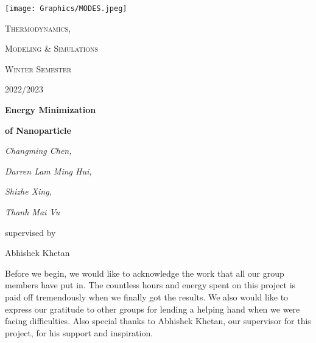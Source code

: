\documentclass{scrartcl}
\begin{document}
\begin{titlepage}
	\centering
	\texttt{[image: Graphics/MODES.jpeg]}\par
	\vspace{2cm}
	{\scshape\LARGE Thermodynamics, \par}  %
	{\scshape\LARGE Modeling \& Simulations \par}                
	\vspace{1cm}
	{\scshape\Large Winter Semester\par}
    {\scshape\Large 2022/2023\par}
	\vfill
	
	{\huge\bfseries Energy Minimization\par}
    {\huge\bfseries of Nanoparticle\par}
	\vfill
	
	{\Large\itshape Changming Chen,}\par
    \vspace{.15cm}
    {\Large\itshape Darren Lam Ming Hui,}\par
    \vspace{.15cm}
    {\Large\itshape Shizhe Xing,}\par
    \vspace{.15cm}
    {\Large\itshape Thanh Mai Vu}\par
	\vspace{.15cm}

	\vfill
	supervised by\par
	Abhishek Khetan


	\vfill
\end{titlepage}

\newpage

\begin{acknowledgements}
Before we begin, we would like to acknowledge the work that all our group members have put in. The countless hours and energy spent on this project is paid off tremendously when we finally got the results. We also would like to express our gratitude to other groups for lending a helping hand when we were facing difficulties. Also special thanks to Abhishek Khetan, our supervisor for this project, for his support and inspiration. 
\end{acknowledgements}
\end{document}
